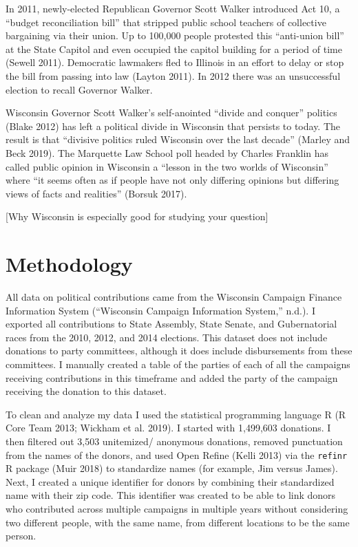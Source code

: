 \documentclass[12pt,]{article}
\begin{document}
In 2011, newly-elected Republican Governor Scott Walker introduced Act
10, a ``budget reconciliation bill'' that stripped public school
teachers of collective bargaining via their union. Up to 100,000 people
protested this ``anti-union bill'' at the State Capitol and even
occupied the capitol building for a period of time (Sewell 2011).
Democratic lawmakers fled to Illinois in an effort to delay or stop the
bill from passing into law (Layton 2011). In 2012 there was an
unsuccessful election to recall Governor Walker.

Wisconsin Governor Scott Walker's self-anointed ``divide and conquer''
politics (Blake 2012) has left a political divide in Wisconsin that
persists to today. The result is that ``divisive politics ruled
Wisconsin over the last decade'' (Marley and Beck 2019). The Marquette
Law School poll headed by Charles Franklin has called public opinion in
Wisconsin a ``lesson in the two worlds of Wisconsin'' where ``it seems
often as if people have not only differing opinions but differing views
of facts and realities'' (Borsuk 2017).

{[}Why Wisconsin is especially good for studying your question{]}

\hypertarget{methodology}{%
\section{Methodology}\label{methodology}}

All data on political contributions came from the Wisconsin Campaign
Finance Information System (``Wisconsin Campaign Information System,''
n.d.). I exported all contributions to State Assembly, State Senate, and
Gubernatorial races from the 2010, 2012, and 2014 elections. This
dataset does not include donations to party committees, although it does
include disbursements from these committees. I manually created a table
of the parties of each of all the campaigns receiving contributions in
this timeframe and added the party of the campaign receiving the
donation to this dataset.

To clean and analyze my data I used the statistical programming language
R (R Core Team 2013; Wickham et al. 2019). I started with 1,499,603
donations. I then filtered out 3,503 unitemized/ anonymous donations,
removed punctuation from the names of the donors, and used Open Refine
(Kelli 2013) via the \texttt{refinr} R package (Muir 2018) to
standardize names (for example, Jim versus James). Next, I created a
unique identifier for donors by combining their standardized name with
their zip code. This identifier was created to be able to link donors
who contributed across multiple campaigns in multiple years without
considering two different people, with the same name, from different
locations to be the same person.
\end{document}
